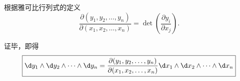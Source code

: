 \begin{myproof}
    根据雅可比行列式的定义
    \begin{equation}
        \frac{\partial(y_1, y_2, \dots, y_n)}{\partial(x_1, x_2, \dots, x_n)} = \det \left( \frac{\partial y_i}{\partial x_j} \right).
    \end{equation}

    证毕，即得
    \begin{equation}
        \boxed{\d y_1 \wedge \d y_2 \wedge \dots \wedge \d y_n = \frac{\partial(y_1, y_2, \dots, y_n)}{\partial(x_1, x_2, \dots, x_n)} \d x_1 \wedge \d x_2 \wedge \dots \wedge \d x_n}
    \end{equation}
\end{myproof}
